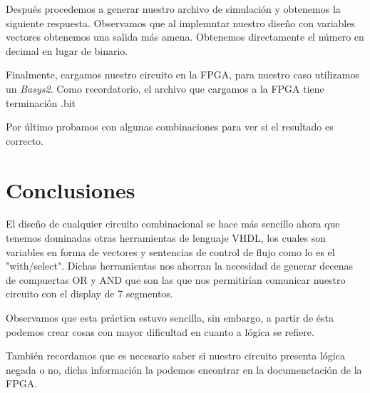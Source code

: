 \documentclass{mylib/reporteConCalif}
\begin{document}

Después procedemos a generar nuestro archivo de simulación y obtenemos la siguiente respuesta. Observamos que al implemntar nuestro diseño con variables vectores obtenemos una salida más amena. Obtenemos directamente el número en decimal en lugar de binario.


Finalmente, cargamos nuestro circuito en la FPGA, para nuestro caso utilizamos un \textit{Basys2}. Como recordatorio, el archivo que cargamos a la FPGA tiene terminación .bit


Por último probamos con algunas combinaciones para ver si el resultado es correcto.


\section{Conclusiones}

El diseño de cualquier circuito combinacional se hace más sencillo ahora que tenemos dominadas otras herramientas de lenguaje VHDL, los cuales son variables en forma de vectores y sentencias de control de flujo como lo es el "with/select". Dichas herramientas nos ahorran la necesidad de generar decenas de compuertas OR y AND que son las que nos permitirían comunicar nuestro circuito con el display de 7 segmentos.

Observamos que esta práctica estuvo sencilla, sin embargo, a partir de ésta podemos crear cosas con mayor dificultad en cuanto a lógica se refiere.

También recordamos que es necesario saber si nuestro circuito presenta lógica negada o no, dicha información la podemos encontrar en la documenctación de la FPGA.
\end{document}

